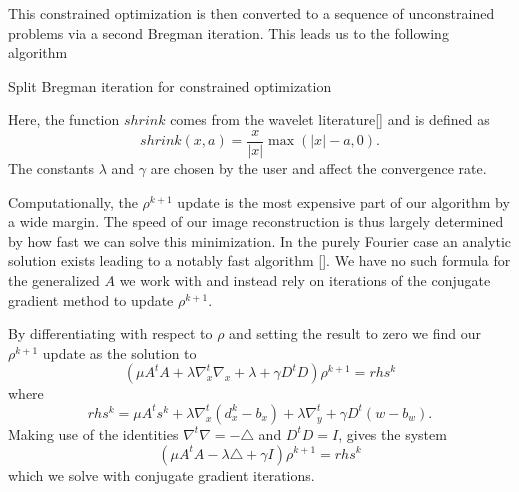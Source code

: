 \documentclass[11pt]{amsart}
\theoremstyle{remark}
\begin{document}
This constrained optimization is then converted to a sequence of unconstrained problems via a second Bregman iteration. This leads us to the following algorithm

\begin{algorithm}[H]
\caption{Split Bregman iteration for constrained optimization}
\label{sbalgo}


\end{algorithm}


Here, the function $shrink$ comes from the wavelet literature[] and is defined as
\begin{equation}
shrink(x,a) = \frac{x}{|x|} \max (|x|-a,0).
\end{equation}
The constants $\lambda$ and $\gamma$ are chosen by the user and affect the convergence rate.

Computationally, the $\rho^{k+1}$ update is the most expensive part of our algorithm by a wide margin. The speed of our image reconstruction is thus largely determined by how fast we can solve this minimization. In the purely Fourier case an analytic solution exists leading to a notably fast algorithm []. We have no such formula for the generalized $A$ we work with and instead rely on iterations of the conjugate gradient method to update $\rho^{k+1}$.

By differentiating with respect to $\rho$ and setting the result to zero we find our $\rho^{k+1}$ update as the solution to
\begin{equation}
(\mu A^tA + \lambda \nabla_x^t \nabla_x + \lambda + \gamma D^tD )\rho^{k+1} = rhs^k
\end{equation}
where
\begin{equation}
rhs^k = \mu A^t s^k + \lambda \nabla_x ^t (d_x^k - b_x) + \lambda \nabla_y^t + \gamma D^t(w - b_w).
\end{equation}
Making use of the identities $\nabla^t \nabla = - \triangle$ and $D^tD = I$, gives the system
\begin{equation}\label{hybridsys}
(\mu A^tA - \lambda \triangle + \gamma I )\rho^{k+1} = rhs^k
\end{equation}
which we solve with conjugate gradient iterations.
\end{document}
